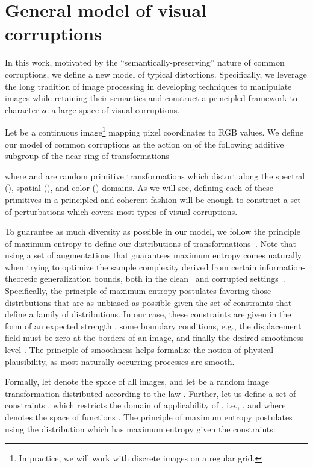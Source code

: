 \documentclass[runningheads]{llncs}
\begin{document}
\section{General model of visual corruptions}
\label{sec:model_of_cc}


In this work, motivated by the ``semantically-preserving'' nature of common corruptions, we define a new model of typical distortions. Specifically, we leverage the long tradition of image processing in developing techniques to manipulate images while retaining their semantics and construct a principled framework to characterize a large space of visual corruptions.

Let  be a continuous image\footnote{In practice, we will work with discrete images on a regular grid.} mapping pixel coordinates  to RGB values. We define our model of common corruptions as the action on  of the following additive subgroup of the near-ring of transformations~\cite{near-ring}

where  and  are random primitive transformations which distort  along the spectral (), spatial (), and color () domains. As we will see, defining each of these primitives in a principled and coherent fashion will be enough to construct a set of perturbations which covers most types of visual corruptions.



To guarantee as much diversity as possible in our model, we follow the principle of maximum entropy to define our distributions of transformations~\cite{cover_info}. Note that using a set of augmentations that guarantees maximum entropy comes naturally when trying to optimize the sample complexity derived from certain information-theoretic generalization bounds, both in the clean~\cite{xuInfoBound} and corrupted settings~\cite{OODInfoBound}. Specifically, the principle of maximum entropy postulates favoring those distributions that are as unbiased as possible given the set of constraints that define a family of distributions. In our case, these constraints are given in the form of an expected strength , some boundary conditions, e.g., the displacement field must be zero at the borders of an image, and finally the desired smoothness level . The principle of smoothness helps formalize the notion of physical plausibility, as most naturally occurring processes are smooth.

Formally, let  denote the space of all images, and let  be a random image transformation distributed according to the law . Further, let us define a set of constraints , which restricts the domain of applicability of , i.e., , and where  denotes the space of functions . The principle of maximum entropy postulates using the distribution  which has maximum entropy given the constraints:
\end{document}
